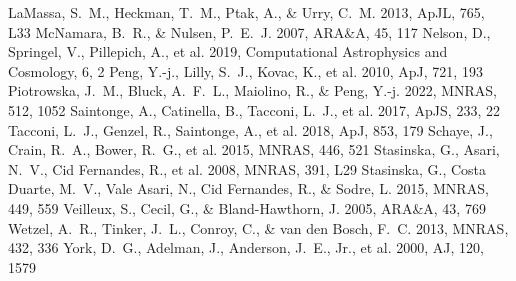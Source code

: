 \documentclass[twocolumn]{aastex631}
\begin{document}
\begin{thebibliography}{}
 LaMassa, S.~M., Heckman, T.~M., Ptak, A., \& Urry, C.~M. 2013, ApJL, 765, L33
 McNamara, B.~R., \& Nulsen, P.~E.~J. 2007, ARA\&A, 45, 117
 Nelson, D., Springel, V., Pillepich, A., et al. 2019, Computational Astrophysics and Cosmology, 6, 2
 Peng, Y.-j., Lilly, S.~J., Kovac, K., et al. 2010, ApJ, 721, 193
 Piotrowska, J.~M., Bluck, A.~F.~L., Maiolino, R., \& Peng, Y.-j. 2022, MNRAS, 512, 1052
 Saintonge, A., Catinella, B., Tacconi, L.~J., et al. 2017, ApJS, 233, 22
 Tacconi, L.~J., Genzel, R., Saintonge, A., et al. 2018, ApJ, 853, 179
 Schaye, J., Crain, R.~A., Bower, R.~G., et al. 2015, MNRAS, 446, 521
 Stasinska, G., Asari, N.~V., Cid Fernandes, R., et al. 2008, MNRAS, 391, L29
 Stasinska, G., Costa Duarte, M.~V., Vale Asari, N., Cid Fernandes, R., \& Sodre, L. 2015, MNRAS, 449, 559
 Veilleux, S., Cecil, G., \& Bland-Hawthorn, J. 2005, ARA\&A, 43, 769
 Wetzel, A.~R., Tinker, J.~L., Conroy, C., \& van den Bosch, F.~C. 2013, MNRAS, 432, 336
 York, D.~G., Adelman, J., Anderson, J.~E., Jr., et al. 2000, AJ, 120, 1579
\end{thebibliography}
\end{document}
